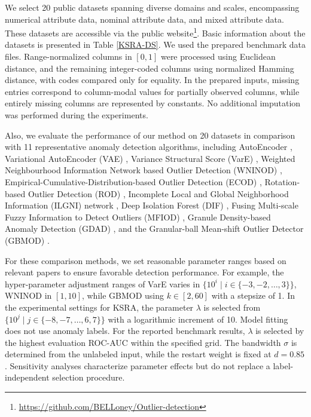 \documentclass[ASNA,twocolumn]{USG} %
\begin{document}
We select 20 public datasets spanning diverse domains and scales, encompassing numerical attribute data, nominal attribute data, and mixed attribute data. These datasets are accessible via the public website\footnote{\url{https://github.com/BELLoney/Outlier-detection}}. Basic information about the datasets is presented in Table \ref{KSRA-DS}. We used the prepared benchmark data files. Range-normalized columns in $[0,1]$ were processed using Euclidean distance, and the remaining integer-coded columns using normalized Hamming distance, with codes compared only for equality. In the prepared inputs, missing entries correspond to column-modal values for partially observed columns, while entirely missing columns are represented by constants. No additional imputation was performed during the experiments.

Also, we evaluate the performance of our method on 20 datasets in comparison with 11 representative anomaly detection algorithms, including AutoEncoder \cite{hinton2006reducing}, Variational AutoEncoder (VAE) \cite{kingma2013auto}, Variance Structural Score (VarE) \cite{8526528}, Weighted Neighbourhood Information Network based Outlier Detection (WNINOD) \cite{wang2021outlier}, Empirical-Cumulative-Distribution-based Outlier Detection (ECOD) \cite{li2022ecod}, Rotation-based Outlier Detection (ROD) \cite{almardeny2020novel}, Incomplete Local and Global Neighborhood Information (ILGNI) network \cite{li2023incomplete}, Deep Isolation Forest (DIF) \cite{xu2023deep}, Fusing Multi-scale Fuzzy Information to Detect Outliers (MFIOD) \cite{chen2024fusing}, Granule Density-based Anomaly Detection (GDAD) \cite{chen2025integrating}, and the Granular-ball Mean-shift Outlier Detector (GBMOD) \cite{cheng2025gbmod}. 

For these comparison methods, we set reasonable parameter ranges based on relevant papers to ensure favorable detection performance. For example, the hyper-parameter adjustment ranges of VarE varies in $\{10^i \mid i \in \{-3, -2, \dots, 3\}\}$, WNINOD in $[1,10]$, while GBMOD using $k \in[2,60]$ with a stepsize of 1. In the experimental settings for KSRA, the parameter $\lambda$ is selected from $\{10^j \mid j \in \{-8, -7, \dots, 6, 7\}\}$ with a logarithmic increment of 10. Model fitting does not use anomaly labels. For the reported benchmark results, $\lambda$ is selected by the highest evaluation ROC-AUC within the specified grid. The bandwidth $\sigma$ is determined from the unlabeled input, while the restart weight is fixed at $d=0.85$. Sensitivity analyses characterize parameter effects but do not replace a label-independent selection procedure.
\end{document}

